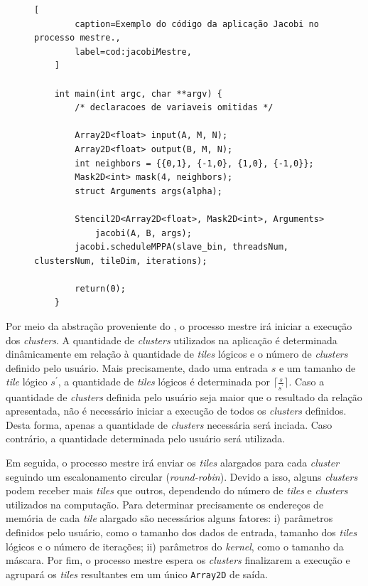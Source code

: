 \begin{figure}[t]
	\begin{lstlisting}[
		caption=Exemplo do código da aplicação Jacobi no processo mestre.,
		label=cod:jacobiMestre,
	]

	int main(int argc, char **argv) {
		/* declaracoes de variaveis omitidas */

		Array2D<float> input(A, M, N);
		Array2D<float> output(B, M, N);
		int neighbors = {{0,1}, {-1,0}, {1,0}, {-1,0}};
		Mask2D<int> mask(4, neighbors);
		struct Arguments args(alpha);

		Stencil2D<Array2D<float>, Mask2D<int>, Arguments>
			jacobi(A, B, args);
		jacobi.scheduleMPPA(slave_bin, threadsNum, clustersNum, tileDim, iterations);

		return(0);
	}
\end{lstlisting}
\end{figure}



Por meio da abstração proveniente do \pskel, o processo mestre irá iniciar a
execução dos \textit{clusters}. A quantidade de \textit{clusters} utilizados na
aplicação é determinada dinâmicamente em relação à quantidade de \textit{tiles}
lógicos e o número de \textit{clusters} definido pelo usuário.  Mais
precisamente, dado uma entrada $s$ e um tamanho de \textit{tile} lógico
$s^\prime$, a quantidade de \textit{tiles} lógicos é determinada por
$\lceil\frac{s}{s^\prime}\rceil$. Caso a quantidade de \textit{clusters}
definida pelo usuário seja maior que o resultado da relação apresentada, não é
necessário iniciar a execução de todos os \textit{clusters} definidos. Desta
forma, apenas a quantidade de \textit{clusters} necessária será inciada. Caso
contrário, a quantidade determinada pelo usuário será utilizada.

Em seguida, o processo mestre irá enviar os \textit{tiles} alargados para cada
\textit{cluster} seguindo um escalonamento circular (\textit{round-robin}).
Devido a isso, alguns \textit{clusters} podem receber mais \textit{tiles} que
outros, dependendo do número de \textit{tiles} e \textit{clusters} utilizados na
computação. Para determinar precisamente os endereços de memória de
cada \textit{tile} alargado são necessários alguns fatores: i) parâmetros
definidos pelo usuário, como o tamanho dos dados de entrada, tamanho dos
\textit{tiles} lógicos e o número de iterações; ii) parâmetros do \stencil
\textit{kernel}, como o tamanho da máscara. Por fim, o processo mestre espera os
\textit{clusters} finalizarem a execução e agrupará os \textit{tiles}
resultantes em um único \texttt{Array2D} de saída.

